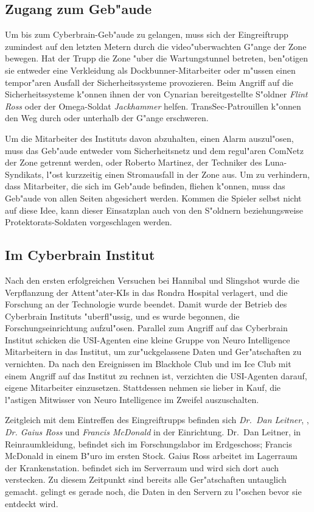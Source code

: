 \subsection{Zugang zum Geb"aude} 
Um bis zum Cyberbrain-Geb"aude zu gelangen, muss sich der Eingreiftrupp zumindest auf den letzten Metern durch die video"uberwachten G"ange der Zone bewegen. Hat der Trupp die Zone "uber die Wartungstunnel betreten, ben"otigen sie entweder eine Verkleidung als Dockbunner-Mitarbeiter oder m"ussen einen tempor"aren Ausfall der Sicherheitssysteme provozieren. Beim Angriff auf die Sicherheitssysteme k"onnen ihnen der von Cynarian bereitgestellte S"oldner \emph{Flint Ross} oder der Omega-Soldat \emph{Jackhammer} helfen. TransSec-Patrouillen k"onnen den Weg durch oder unterhalb der G"ange erschweren.

Um die Mitarbeiter des Instituts davon abzuhalten, einen Alarm auszul"osen, muss das Geb"aude entweder vom Sicherheitsnetz und dem regul"aren ComNetz der Zone getrennt werden, oder Roberto Martinez, der Techniker des Luna-Syndikats, l"ost kurzzeitig einen Stromausfall in der Zone aus. Um zu verhindern, dass Mitarbeiter, die sich im Geb"aude befinden, fliehen k"onnen, muss das Geb"aude von allen Seiten abgesichert werden. Kommen die Spieler selbst nicht auf diese Idee, kann dieser Einsatzplan auch von den S"oldnern beziehungsweise Protektorats-Soldaten vorgeschlagen werden.

\subsection{Im Cyberbrain Institut}
Nach den ersten erfolgreichen Versuchen bei Hannibal und Slingshot wurde die Verpflanzung der Attent"ater-KIs in das Rondra Hospital verlagert, und die Forschung an der Technologie wurde beendet. Damit wurde der Betrieb des Cyberbrain Instituts "uberfl"ussig, und es wurde begonnen, die Forschungseinrichtung aufzul"osen. Parallel zum Angriff auf das Cyberbrain Institut schicken die USI-Agenten eine kleine Gruppe von Neuro Intelligence Mitarbeitern in das Institut, um zur"uckgelassene Daten und Ger"atschaften zu vernichten. Da nach den Ereignissen im Blackhole Club und im Ice Club mit einem Angriff auf das Institut zu rechnen ist, verzichten die USI-Agenten darauf, eigene Mitarbeiter einzusetzen. Stattdessen nehmen sie lieber in Kauf, die l"astigen Mitwisser von Neuro Intelligence im Zweifel auszuschalten.

Zeitgleich mit dem Eintreffen des Eingreiftrupps befinden sich \emph{Dr.~Dan Leitner}, \emph{\ml{}}, \emph{Dr. Gaius Ross} und \emph{Francis McDonald} in der Einrichtung. Dr.~Dan Leitner, in Reinraumkleidung, befindet sich im Forschungslabor im Erdgeschoss; Francis McDonald in einem B"uro im ersten Stock. Gaius Ross arbeitet im Lagerraum der Krankenstation. \ml{} befindet sich im Serverraum und wird sich dort auch verstecken. Zu diesem Zeitpunkt sind bereits alle Ger"atschaften untauglich gemacht. \ml{} gelingt es gerade noch, die Daten in den Servern zu l"oschen bevor sie entdeckt wird.

